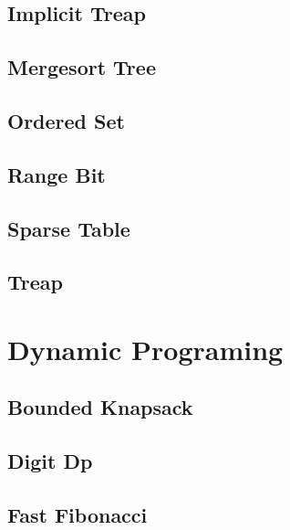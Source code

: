 \documentclass[10pt]{article}
\begin{document}
\subsection{\texorpdfstring{{Implicit Treap}}{{Implicit Treap}}}

\subsection{\texorpdfstring{{Mergesort Tree}}{{Mergesort Tree}}}

\subsection{\texorpdfstring{{Ordered Set}}{{Ordered Set}}}

\subsection{\texorpdfstring{{Range Bit}}{{Range Bit}}}

\subsection{\texorpdfstring{{Sparse Table}}{{Sparse Table}}}

\subsection{\texorpdfstring{{Treap}}{{Treap}}}


\section{Dynamic Programing}
\subsection{\texorpdfstring{{Bounded Knapsack}}{{Bounded Knapsack}}}

\subsection{\texorpdfstring{{Digit Dp}}{{Digit Dp}}}

\subsection{\texorpdfstring{{Fast Fibonacci}}{{Fast Fibonacci}}}

\end{document}
